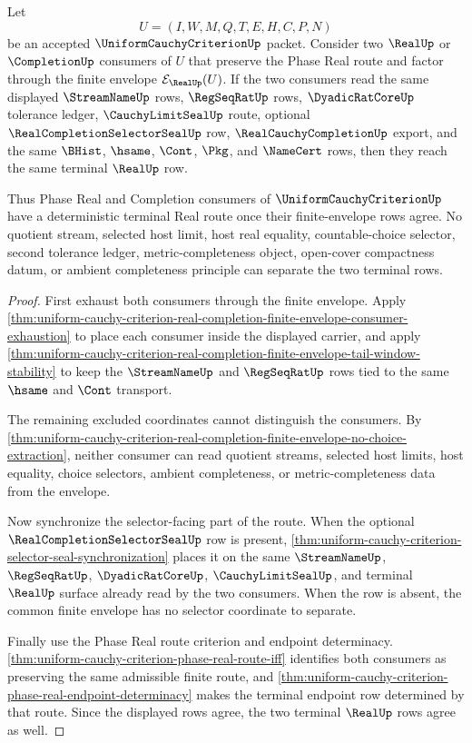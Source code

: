 \begin{theorem}
\label{thm:uniform-cauchy-criterion-finite-envelope-route-determinacy}
Let
$$
U=(I,W,M,Q,T,E,H,C,P,N)
$$
be an accepted $\UniformCauchyCriterionUp$ packet. Consider two $\RealUp$ or $\CompletionUp$ consumers of $U$ that preserve the Phase Real route and factor through the finite envelope $\mathcal{E}_{\RealUp}(U)$. If the two consumers read the same displayed $\StreamNameUp$ rows, $\RegSeqRatUp$ rows, $\DyadicRatCoreUp$ tolerance ledger, $\CauchyLimitSealUp$ route, optional $\RealCompletionSelectorSealUp$ row, $\RealCauchyCompletionUp$ export, and the same $\BHist$, $\hsame$, $\Cont$, $\Pkg$, and $\NameCert$ rows, then they reach the same terminal $\RealUp$ row.

Thus Phase Real and Completion consumers of $\UniformCauchyCriterionUp$ have a deterministic terminal Real route once their finite-envelope rows agree. No quotient stream, selected host limit, host real equality, countable-choice selector, second tolerance ledger, metric-completeness object, open-cover compactness datum, or ambient completeness principle can separate the two terminal rows.
\end{theorem}
\begin{proof}
First exhaust both consumers through the finite envelope. Apply \autoref{thm:uniform-cauchy-criterion-real-completion-finite-envelope-consumer-exhaustion} to place each consumer inside the displayed carrier, and apply \autoref{thm:uniform-cauchy-criterion-real-completion-finite-envelope-tail-window-stability} to keep the $\StreamNameUp$ and $\RegSeqRatUp$ rows tied to the same $\hsame$ and $\Cont$ transport.

The remaining excluded coordinates cannot distinguish the consumers. By \autoref{thm:uniform-cauchy-criterion-real-completion-finite-envelope-no-choice-extraction}, neither consumer can read quotient streams, selected host limits, host equality, choice selectors, ambient completeness, or metric-completeness data from the envelope.

Now synchronize the selector-facing part of the route. When the optional $\RealCompletionSelectorSealUp$ row is present, \autoref{thm:uniform-cauchy-criterion-selector-seal-synchronization} places it on the same $\StreamNameUp$, $\RegSeqRatUp$, $\DyadicRatCoreUp$, $\CauchyLimitSealUp$, and terminal $\RealUp$ surface already read by the two consumers. When the row is absent, the common finite envelope has no selector coordinate to separate.

Finally use the Phase Real route criterion and endpoint determinacy. \autoref{thm:uniform-cauchy-criterion-phase-real-route-iff} identifies both consumers as preserving the same admissible finite route, and \autoref{thm:uniform-cauchy-criterion-phase-real-endpoint-determinacy} makes the terminal endpoint row determined by that route. Since the displayed rows agree, the two terminal $\RealUp$ rows agree as well.
\end{proof}

